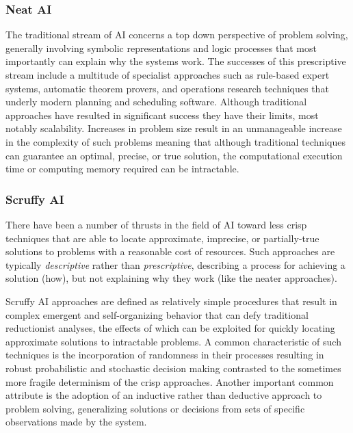 \begin{bibunit}
\subsubsection{Neat AI}
The traditional stream of AI concerns a top down perspective of problem solving, generally involving symbolic representations and logic processes that most importantly can explain why the systems work. The successes of this prescriptive stream include a multitude of specialist approaches such as rule-based expert systems, automatic theorem provers, and operations research techniques that underly modern planning and scheduling software. Although traditional approaches have resulted in significant success they have their limits, most notably scalability. Increases in problem size result in an unmanageable increase in the complexity of such problems meaning that although traditional techniques can guarantee an optimal, precise, or true solution, the computational execution time or computing memory required can be intractable.

\subsubsection{Scruffy AI}
There have been a number of thrusts in the field of AI toward less crisp techniques that are able to locate approximate, imprecise, or partially-true solutions to problems with a reasonable cost of resources. Such approaches are typically \emph{descriptive} rather than \emph{prescriptive}, describing a process for achieving a solution (how), but not explaining why they work (like the neater approaches). 

Scruffy AI approaches are defined as relatively simple procedures that result in complex emergent and self-organizing behavior that can defy traditional reductionist analyses, the effects of which can be exploited for quickly locating approximate solutions to intractable problems. A common characteristic of such techniques is the incorporation of randomness in their processes resulting in robust probabilistic and stochastic decision making contrasted to the sometimes more fragile determinism of the crisp approaches. Another important common attribute is the adoption of an inductive rather than deductive approach to problem solving, generalizing solutions or decisions from sets of specific observations made by the system.

% 
% 

\end{bibunit}
